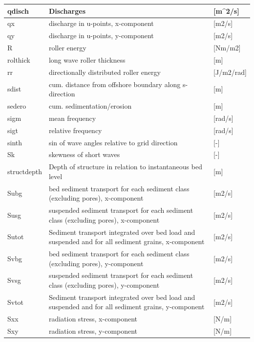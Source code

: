 \documentclass{article}
\begin{document}
\begin{tabular}{|p{0.7in}|p{2.5in}|p{0.9in}|}
qdisch & Discharges                & [m\^{}2/s] \\ \hline 
qx & discharge in u-points, x-component             & [m2/s] \\ \hline 
qy & discharge in u-points, y-component             & [m2/s] \\ \hline 
R & roller energy               & [Nm/m2] \\ \hline 
rolthick & long wave roller thickness             & [m] \\ \hline 
rr & directionally distributed roller energy             & [J/m2/rad] \\ \hline 
sdist & cum. distance from offshore boundary along s-direction          & [m] \\ \hline 
sedero & cum. sedimentation/erosion               & [m] \\ \hline 
sigm & mean frequency               & [rad/s] \\ \hline 
sigt & relative frequency               & [rad/s] \\ \hline 
sinth & sin of wave angles relative to grid direction         & [-] \\ \hline 
Sk & skewness of short waves             & [-] \\ \hline 
structdepth & Depth of structure in relation to instantaneous bed level        & [m] \\ \hline 
Subg & bed sediment transport for each sediment class (excluding pores), x-component       & [m2/s] \\ \hline 
Susg & suspended sediment transport for each sediment class (excluding pores), x-component       & [m2/s] \\ \hline 
Sutot & Sediment transport integrated over bed load and suspended and for all sediment grains, x-component   & [m2/s] \\ \hline 
Svbg & bed sediment transport for each sediment class (excluding pores), y-component       & [m2/s] \\ \hline 
Svsg & suspended sediment transport for each sediment class (excluding pores), y-component       & [m2/s] \\ \hline 
Svtot & Sediment transport integrated over bed load and suspended and for all sediment grains, y-component   & [m2/s] \\ \hline 
Sxx & radiation stress, x-component              & [N/m] \\ \hline 
Sxy & radiation stress, y-component              & [N/m] \\ \hline 

\end{tabular}
\end{document}
